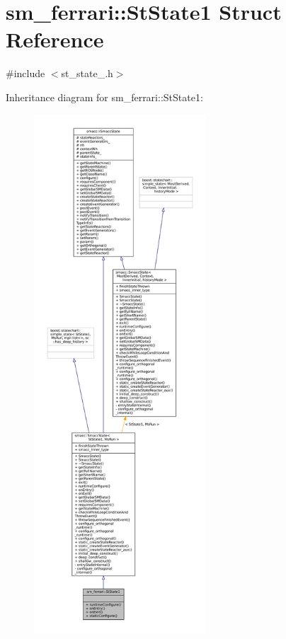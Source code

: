 \hypertarget{structsm__ferrari_1_1StState1}{}\section{sm\+\_\+ferrari\+:\+:St\+State1 Struct Reference}
\label{structsm__ferrari_1_1StState1}


{\ttfamily \#include $<$st\+\_\+state\+\_.\+h$>$}



Inheritance diagram for sm\+\_\+ferrari\+:\+:St\+State1\+:
\nopagebreak
\begin{figure}[H]
\begin{center}
\leavevmode
\includegraphics[height=550pt]{structsm__ferrari_1_1StState1__inherit__graph}
\end{center}
\end{figure}


